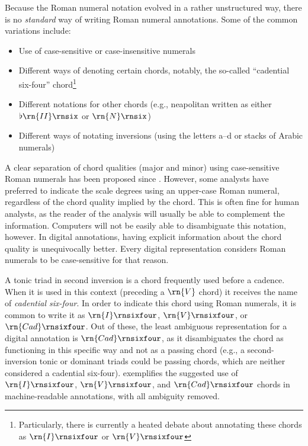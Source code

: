 

Because the Roman numeral notation evolved in a rather
unstructured way, there is no \emph{standard} way of writing
Roman numeral annotations. 
Some of the common variations include:

\begin{itemize}
    \item Use of case-sensitive or case-insensitive numerals
    \item Different ways of denoting certain chords,
    notably, the so-called ``cadential six-four''
    chord\footnote{Particularly, there is currently a heated
    debate about annotating these chords as
    $\rn{I}\rnsixfour$ or $\rn{V}\rnsixfour$}
    \item Different notations for other chords (e.g.,
    \gls{neapolitan} written as either $\flat\rn{II}\rnsix$ or
    $\rn{N}\rnsix$)
    \item Different ways of notating inversions (using the
    letters a--d or stacks of Arabic numerals)
\end{itemize}

A clear separation of chord qualities (major and minor)
using case-sensitive Roman numerals has been proposed since
\textcite{weber1817versuch}. However, some analysts have
preferred to indicate the scale degrees using an upper-case
Roman numeral, regardless of the chord quality implied by
the chord. This is often fine for human analysts, as the
reader of the analysis will usually be able to complement
the information. Computers will not be easily able to
disambiguate this notation, however. In digital annotations,
having explicit information about the chord quality is
unequivocally better. Every digital representation considers
Roman numerals to be case-sensitive for that reason.

A tonic triad in second inversion is a chord frequently used
before a cadence. When it is used in this context (preceding
a $\rn{V}$ chord) it receives the name of \emph{cadential
six-four}. In order to indicate this chord using Roman
numerals, it is common to write it as $\rn{I}\rnsixfour$,
$\rn{V}\rnsixfour$, or $\rn{Cad}\rnsixfour$. Out of these,
the least ambiguous representation for a digital annotation
is $\rn{Cad}\rnsixfour$, as it disambiguates the chord as
functioning in this specific way and not as a passing chord
(e.g., a second-inversion tonic or dominant triads could be
passing chords, which are neither considered a cadential
six-four).  exemplifies the
suggested use of $\rn{I}\rnsixfour$, $\rn{V}\rnsixfour$, and
$\rn{Cad}\rnsixfour$ chords in machine-readable annotations,
with all ambiguity removed.

